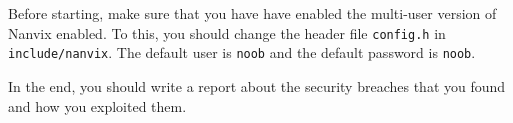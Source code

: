 \documentclass[11pt]{article}
\newif\ifbr
\begin{document}
Before starting, make sure that you have have enabled the multi-user
version of Nanvix enabled. To this, you should change the header file
\texttt{config.h} in \texttt{include/nanvix}. The default user is \texttt{noob} and
the default password is \texttt{noob}.

In the end, you should write a report about the security breaches that
you found and how you exploited them.

\fi\fi

\ifbr

\subsubsection*{Recompensas}

Além das falhas indicadas, uma falha de \textit{buffer overflow} está
presente no sistema. O grupo que conseguir encontrá-la e explorará-la
será devidamente recompensado.

\fi
\end{document}
